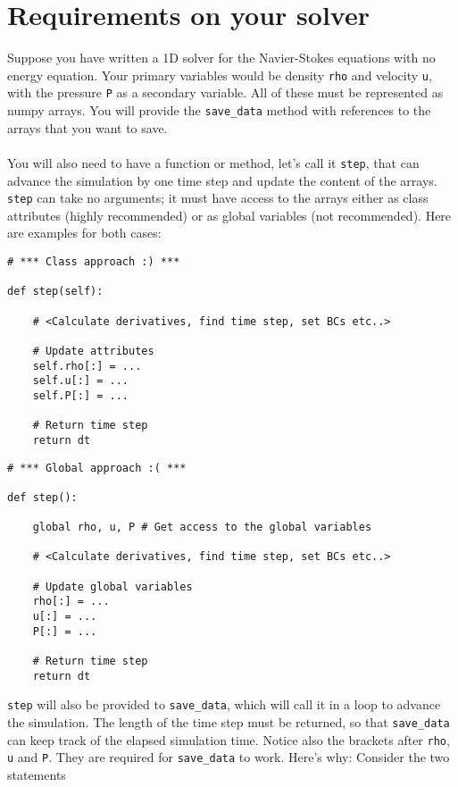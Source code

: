 \documentclass{article}
\newcommand{\ttt}[1]{\texttt{#1}}
\begin{document}
\section{Requirements on your solver}
\label{sec:req}
Suppose you have written a 1D solver for the Navier-Stokes equations with no energy equation. Your primary variables would be density \ttt{rho} and velocity \ttt{u}, with the pressure \ttt{P} as a secondary variable. All of these must be represented as numpy arrays. You will provide the \ttt{save\_data} method with references to the arrays that you want to save.\\\\
You will also need to have a function or method, let's call it \ttt{step}, that can advance the simulation by one time step and update the content of the arrays. \ttt{step} can take no arguments; it must have access to the arrays either as class attributes (highly recommended) or as global variables (not recommended). Here are examples for both cases:\\
\begin{minipage}{\linewidth}
\begin{lstlisting}
# *** Class approach :) ***

def step(self):

	# <Calculate derivatives, find time step, set BCs etc..>

	# Update attributes
	self.rho[:] = ...
	self.u[:] = ...
	self.P[:] = ...

	# Return time step
	return dt
\end{lstlisting}
\end{minipage}
\begin{minipage}{\linewidth}
\begin{lstlisting}
# *** Global approach :( ***

def step():

	global rho, u, P # Get access to the global variables

	# <Calculate derivatives, find time step, set BCs etc..>

	# Update global variables
	rho[:] = ...
	u[:] = ...
	P[:] = ...

	# Return time step
	return dt
\end{lstlisting}
\end{minipage}
\ttt{step} will also be provided to \ttt{save\_data}, which will call it in a loop to advance the simulation. The length of the time step must be returned, so that \ttt{save\_data} can keep track of the elapsed simulation time. Notice also the brackets after \ttt{rho}, \ttt{u} and \ttt{P}. They are required for \ttt{save\_data} to work. Here's why: Consider the two statements
\end{document}
